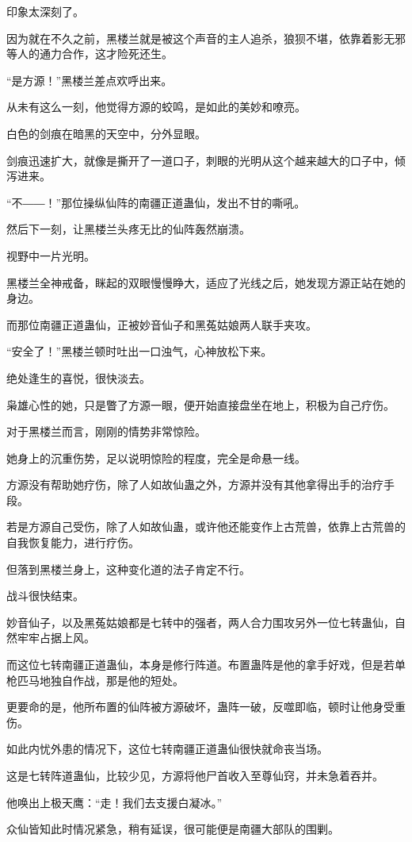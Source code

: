 \begin{this_body}
印象太深刻了。

因为就在不久之前，黑楼兰就是被这个声音的主人追杀，狼狈不堪，依靠着影无邪等人的通力合作，这才险死还生。

“是方源！”黑楼兰差点欢呼出来。

从未有这么一刻，他觉得方源的蛟鸣，是如此的美妙和嘹亮。

白色的剑痕在暗黑的天空中，分外显眼。

剑痕迅速扩大，就像是撕开了一道口子，刺眼的光明从这个越来越大的口子中，倾泻进来。

“不――！”那位操纵仙阵的南疆正道蛊仙，发出不甘的嘶吼。

然后下一刻，让黑楼兰头疼无比的仙阵轰然崩溃。

视野中一片光明。

黑楼兰全神戒备，眯起的双眼慢慢睁大，适应了光线之后，她发现方源正站在她的身边。

而那位南疆正道蛊仙，正被妙音仙子和黑菟姑娘两人联手夹攻。

“安全了！”黑楼兰顿时吐出一口浊气，心神放松下来。

绝处逢生的喜悦，很快淡去。

枭雄心性的她，只是瞥了方源一眼，便开始直接盘坐在地上，积极为自己疗伤。

对于黑楼兰而言，刚刚的情势非常惊险。

她身上的沉重伤势，足以说明惊险的程度，完全是命悬一线。

方源没有帮助她疗伤，除了人如故仙蛊之外，方源并没有其他拿得出手的治疗手段。

若是方源自己受伤，除了人如故仙蛊，或许他还能变作上古荒兽，依靠上古荒兽的自我恢复能力，进行疗伤。

但落到黑楼兰身上，这种变化道的法子肯定不行。

战斗很快结束。

妙音仙子，以及黑菟姑娘都是七转中的强者，两人合力围攻另外一位七转蛊仙，自然牢牢占据上风。

而这位七转南疆正道蛊仙，本身是修行阵道。布置蛊阵是他的拿手好戏，但是若单枪匹马地独自作战，那是他的短处。

更要命的是，他所布置的仙阵被方源破坏，蛊阵一破，反噬即临，顿时让他身受重伤。

如此内忧外患的情况下，这位七转南疆正道蛊仙很快就命丧当场。

这是七转阵道蛊仙，比较少见，方源将他尸首收入至尊仙窍，并未急着吞并。

他唤出上极天鹰：“走！我们去支援白凝冰。”

众仙皆知此时情况紧急，稍有延误，很可能便是南疆大部队的围剿。


\end{this_body}
